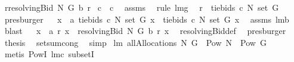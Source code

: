 \begin{isabellebody}
\ {\isacharquery}r{\isacharprime}{\isacharequal}{\isachardoublequoteopen}resolvingBid{\isacharprime}\ N\ G\ b\ r{\isachardoublequoteclose}\isanewline
{}\isamarkupfalse%
\ {\isachardoublequoteopen}{\isacharquery}c{\isacharprime}\ {\isacharequal}\ {\isacharquery}c{\isachardoublequoteclose}\ \isamarkupfalse%
\ assms{\isacharparenleft}{}{\isacharcomma}{}{\isacharparenright}\ \isamarkupfalse%
\ {\isacharparenleft}rule\ lm{}{}g{\isacharparenright}\ \isamarkupfalse%
\isanewline
{}\isamarkupfalse%
\ {\isachardoublequoteopen}{\isacharquery}r{\isacharprime}\ {\isacharequal}\ tiebids{\isacharprime}\ {\isacharquery}c\ N\ {\isacharparenleft}set\ G{\isacharparenright}{\isachardoublequoteclose}\ \isamarkupfalse%
\ presburger\isanewline
{}\isamarkupfalse%
\ \isamarkupfalse%
\ {\isachardoublequoteopen}{\isasymforall}x\ {\isasymin}\ a{\isachardot}\ tiebids{\isacharprime}\ {\isacharquery}c\ N\ {\isacharparenleft}set\ G{\isacharparenright}\ x\ {\isacharequal}\ tiebids\ {\isacharquery}c\ N\ {\isacharparenleft}set\ G{\isacharparenright}\ x{\isachardoublequoteclose}\ \isamarkupfalse%
\ assms{\isacharparenleft}{}{\isacharparenright}\ lm{}{}b\ \isamarkupfalse%
\ blast\isanewline
{}\isamarkupfalse%
\ \isamarkupfalse%
\ {\isachardoublequoteopen}{\isasymforall}x\ {\isasymin}\ a{\isachardot}\ {\isacharquery}r{\isacharprime}\ x\ {\isacharequal}\ resolvingBid\ N\ G\ b\ r\ x{\isachardoublequoteclose}\ \isamarkupfalse%
\ resolvingBid{\isacharunderscore}def\ \isamarkupfalse%
\ presburger\isanewline
{}\isamarkupfalse%
\ {\isacharquery}thesis\ \isamarkupfalse%
\ setsum{\isachardot}cong\ \isamarkupfalse%
\ simp\isanewline
{}\isamarkupfalse%
%
\endisatagproof
{\isafoldproof}%
%
\isadelimproof
\isanewline
%
\endisadelimproof
{}\isamarkupfalse%
\ lm{}{}{\isacharcolon}\ {\isachardoublequoteopen}allAllocations\ N\ G\ {\isasymsubseteq}\ Pow\ {\isacharparenleft}N\ {\isasymtimes}\ {\isacharparenleft}Pow\ G\ {\isacharminus}\ {\isacharbraceleft}{\isacharbraceleft}{\isacharbraceright}{\isacharbraceright}{\isacharparenright}{\isacharparenright}{\isachardoublequoteclose}%
\isadelimproof
\ %
\endisadelimproof
%
\isatagproof
{}\isamarkupfalse%
\ {\isacharparenleft}metis\ PowI\ lm{}{}c\ subsetI{\isacharparenright}%

\end{isabellebody}
